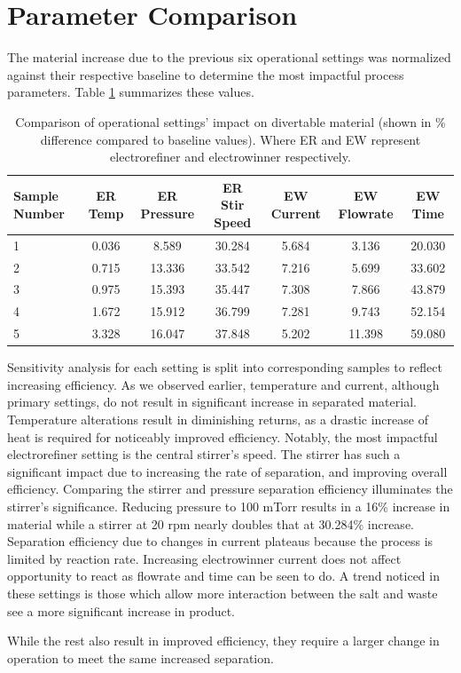 \section{Parameter Comparison}

The material increase due to the previous six operational settings was normalized against their respective baseline
to determine the most impactful process parameters. Table \ref{tab:compare} summarizes these values.

\begin{table}[h]
	\centering
	\begin{tabularx}{\linewidth}{lcccccc}
		\hline
		\textbf{Sample Number} & \textbf{ER Temp} & \textbf{ER Pressure} & \textbf{ER Stir Speed} & \textbf{EW Current}
		& \textbf{EW Flowrate} & \textbf{EW Time} \\
		\hline \hline
		1 & 0.036 & 8.589 & 30.284 & 5.684 & 3.136 & 20.030 \\ \hline
		2 & 0.715 & 13.336 & 33.542 & 7.216 & 5.699 & 33.602 \\ \hline
		3 & 0.975 & 15.393 & 35.447 & 7.308 & 7.866 & 43.879 \\ 
		4 & 1.672 & 15.912 & 36.799 & 7.281 & 9.743 & 52.154 \\ \hline
		5 & 3.328 & 16.047 & 37.848 & 5.202 & 11.398 & 59.080 \\ \hline
	\end{tabularx}
	\caption {Comparison of operational settings' impact on divertable material (shown in
		\% difference compared to baseline values). Where ER and EW represent electrorefiner and electrowinner respectively.}
	\label {tab:compare}
\end{table}

Sensitivity analysis for each setting is split into corresponding samples to reflect increasing efficiency. As we observed earlier, temperature and current, although primary settings, 
do not result in significant increase in separated material. Temperature alterations result in diminishing returns, as a drastic increase of heat is required for noticeably improved efficiency. Notably,
the most impactful electrorefiner setting is the central stirrer's speed. The stirrer  
has such a significant impact due to increasing the rate of separation, and improving overall
efficiency. Comparing the stirrer and pressure separation efficiency illuminates the stirrer's significance. Reducing pressure to 100 mTorr results in a 16\% increase in material while a stirrer at 20 rpm nearly doubles that at 30.284\% increase.
Separation efficiency due to changes in current plateaus because the process is limited by reaction rate. Increasing electrowinner current does not affect opportunity to react as flowrate and time can be seen to do. 
A trend noticed in these settings is those which allow more interaction between the salt and waste see a more significant increase in product. 

While the rest also result in
improved efficiency, they require a larger change in operation to meet the same increased separation.